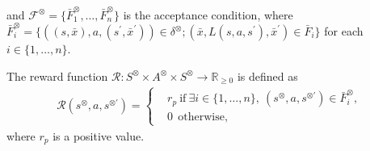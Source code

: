 \begin{definition}
  and ${\mathcal F}^{\otimes} = \{ \bar{F}^{\otimes}_1, \ldots ,\bar{F}^{\otimes}_n \}$ is the acceptance condition, where $\bar{F}^{\otimes}_i = \{ ((s,\bar{x}), a, (s^{\prime}, \bar{x}^{\prime})) \in \delta^{\otimes} ; (\bar{x}, L(s,a,s^{\prime}), \bar{x}^{\prime}) \in \bar{F}_i \}$ for each $ i \in \{ 1, \ldots ,n \}$.

\label{def9}
\end{definition}

\begin{definition}
  The reward function $\mathcal{R} :S^{\otimes} \times A^{\otimes} \times S^{\otimes} \rightarrow {\mathbb R}_{\geq 0}$ is defined as
  \begin{align}
    \mathcal{R}(s^{\otimes}, a, s^{\otimes \prime}) =
    \left\{
    \begin{aligned}
      &r_p \  \text{if}\ \exists i \in \! \{ 1, \ldots ,n \},\ (s^{\otimes}, a, s^{\otimes \prime}) \in \bar{F}^{\otimes}_i \!,\\
      &0   \ \ \text{otherwise},
    \end{aligned}
    \right. \nonumber
  \end{align}
  where $r_p$ is a positive value.
  \label{def10}
\end{definition}

